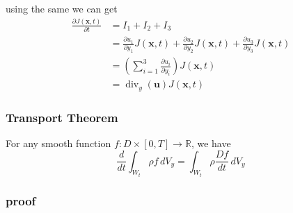 using the same we can get 
\begin{equation}
\begin{aligned}
\frac{\partial J(\textbf{x},t)}{\partial t}
&= I_1 + I_2 + I_3 \\
&= \frac{\partial u_1}{\partial y_1} J (\textbf{x},t)
+ \frac{\partial u_2}{\partial y_2} J (\textbf{x},t)
+ \frac{\partial u_3}{\partial y_3} J (\textbf{x},t)\\
&= \left(\sum_{i=1}^{3} \frac{\partial u_i}{\partial y_i}\right) J (\textbf{x},t)\\
&= \operatorname{div}_{y} \left(\textbf{u}\right) J (\textbf{x},t)
\end{aligned}
\end{equation}


\subsubsection{Transport Theorem} %

For any smooth function $f:D\times [0,T] \to \mathbb{R}$, we have
\begin{equation}
\frac{d}{dt}\int_{W_t} \rho f \,dV_y = \int_{W_t} \rho \frac{Df}{dt} \,dV_y
\end{equation}


\subsubsection{proof} %

